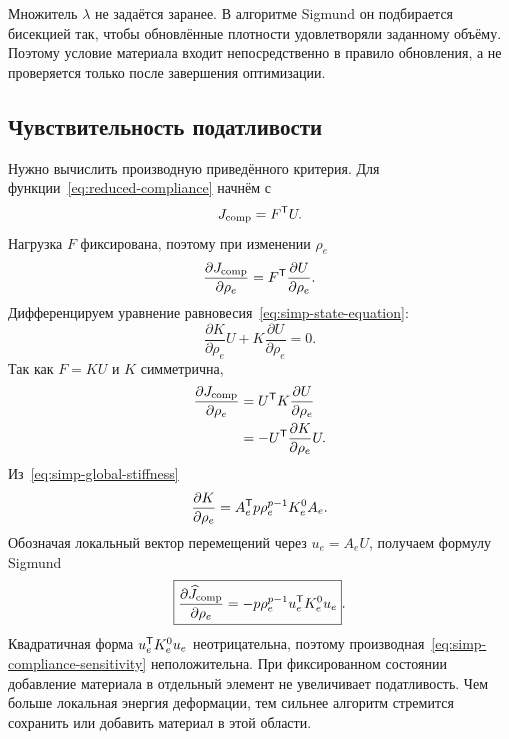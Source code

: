 Множитель $\lambda$ не задаётся заранее. В алгоритме Sigmund он подбирается бисекцией так, чтобы обновлённые плотности удовлетворяли заданному объёму. Поэтому условие материала входит непосредственно в правило обновления, а не проверяется только после завершения оптимизации.

\subsection{Чувствительность податливости}

Нужно вычислить производную приведённого критерия. Для функции~\eqref{eq:reduced-compliance} начнём с
\begin{equation}
 J_{\mathrm{comp}}=F^{\mathsf{T}}U.
\end{equation}
Нагрузка $F$ фиксирована, поэтому при изменении $\rho_e$
\begin{equation}
 \frac{\partial J_{\mathrm{comp}}}{\partial\rho_e}
 =
 F^{\mathsf{T}}
 \frac{\partial U}{\partial\rho_e}.
\end{equation}
Дифференцируем уравнение равновесия~\eqref{eq:simp-state-equation}:
\begin{equation}
\label{eq:state-differentiation}
 \frac{\partial K}{\partial\rho_e}U
 +
 K\frac{\partial U}{\partial\rho_e}
 =0.
\end{equation}
Так как $F=KU$ и $K$ симметрична,
\begin{equation}
 \begin{aligned}
 \frac{\partial J_{\mathrm{comp}}}{\partial\rho_e}
 &=
 U^{\mathsf{T}}K
 \frac{\partial U}{\partial\rho_e}\\
 &=-
 U^{\mathsf{T}}
 \frac{\partial K}{\partial\rho_e}
 U.
 \end{aligned}
\end{equation}
Из~\eqref{eq:simp-global-stiffness}
\begin{equation}
 \frac{\partial K}{\partial\rho_e}
 =
 A_e^{\mathsf{T}}
 p\rho_e^{p-1}K_e^0
 A_e.
\end{equation}
Обозначая локальный вектор перемещений через $u_e=A_eU$, получаем формулу Sigmund
\begin{equation}
\label{eq:simp-compliance-sensitivity}
 \boxed{
 \frac{\partial \widehat J_{\mathrm{comp}}}{\partial\rho_e}
 =
 -p\rho_e^{p-1}
 u_e^{\mathsf{T}}K_e^0u_e
 }.
\end{equation}
Квадратичная форма $u_e^{\mathsf{T}}K_e^0u_e$ неотрицательна, поэтому производная~\eqref{eq:simp-compliance-sensitivity} неположительна. При фиксированном состоянии добавление материала в отдельный элемент не увеличивает податливость. Чем больше локальная энергия деформации, тем сильнее алгоритм стремится сохранить или добавить материал в этой области.

